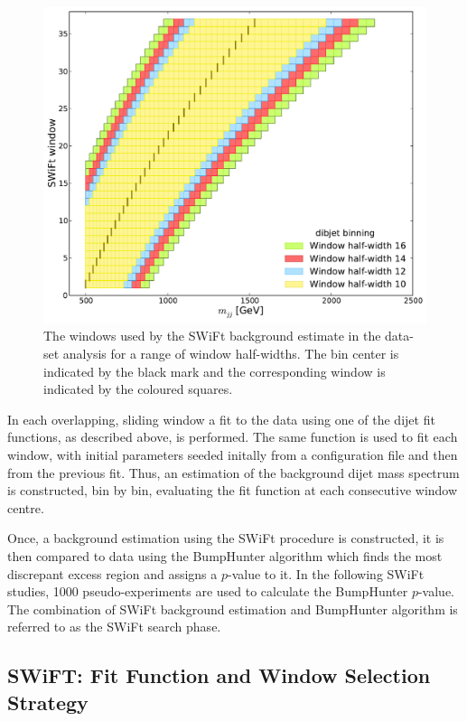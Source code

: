\begin{figure}[!htb]
\centering
\includegraphics[scale=0.5, angle=0]{figs/Dibjet/LowMass/evt-swiftBins_min500_fl0_fh0_tr0.pdf}
\vspace{10pt}
\caption{\label{fig:bkg-lm_swiftBins}
  The windows used by the SWiFt background estimate in the \lm{} data-set analysis for a range of window half-widths.
  The bin center is indicated by the black mark and the corresponding window is indicated by the coloured squares.}
\end{figure}

In each overlapping, sliding window a fit to the data using one of the dijet fit functions, as described above, is performed.
The same function is used to fit each window,
with initial parameters seeded initally from a configuration file and then from the previous fit.
Thus, an estimation of the background dijet mass spectrum is constructed, bin by bin,
evaluating the fit function at each consecutive window centre.

Once, a background estimation using the SWiFt procedure is constructed,
it is then compared to data using the {\sc BumpHunter} algorithm which finds the most discrepant excess region and assigns a \mbox{$p$-value} to it.
In the following SWiFt studies, 1000 pseudo-experiments are used to calculate the {\sc BumpHunter} \mbox{$p$-value}.
The combination of SWiFt background estimation and {\sc BumpHunter} algorithm is referred to as the SWiFt search phase.

\subsection{SWiFT: Fit Function and Window Selection Strategy}
\label{sec:windowSel}

